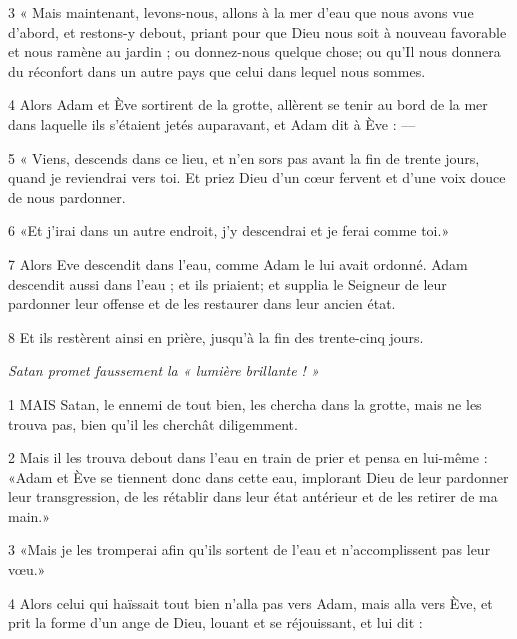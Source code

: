 \par 3 « Mais maintenant, levons-nous, allons à la mer d'eau que nous avons vue d'abord, et restons-y debout, priant pour que Dieu nous soit à nouveau favorable et nous ramène au jardin ; ou donnez-nous quelque chose; ou qu'Il nous donnera du réconfort dans un autre pays que celui dans lequel nous sommes.

\par 4 Alors Adam et Ève sortirent de la grotte, allèrent se tenir au bord de la mer dans laquelle ils s'étaient jetés auparavant, et Adam dit à Ève : —

\par 5 « Viens, descends dans ce lieu, et n'en sors pas avant la fin de trente jours, quand je reviendrai vers toi. Et priez Dieu d’un cœur fervent et d’une voix douce de nous pardonner.

\par 6 «Et j'irai dans un autre endroit, j'y descendrai et je ferai comme toi.»

\par 7 Alors Eve descendit dans l'eau, comme Adam le lui avait ordonné. Adam descendit aussi dans l'eau ; et ils priaient; et supplia le Seigneur de leur pardonner leur offense et de les restaurer dans leur ancien état.

\par 8 Et ils restèrent ainsi en prière, jusqu'à la fin des trente-cinq jours.


\par \textit{Satan promet faussement la « lumière brillante ! »}

\par 1 MAIS Satan, le ennemi de tout bien, les chercha dans la grotte, mais ne les trouva pas, bien qu'il les cherchât diligemment.

\par 2 Mais il les trouva debout dans l'eau en train de prier et pensa en lui-même : «Adam et Ève se tiennent donc dans cette eau, implorant Dieu de leur pardonner leur transgression, de les rétablir dans leur état antérieur et de les retirer de ma main.»

\par 3 «Mais je les tromperai afin qu'ils sortent de l'eau et n'accomplissent pas leur vœu.»

\par 4 Alors celui qui haïssait tout bien n'alla pas vers Adam, mais alla vers Ève, et prit la forme d'un ange de Dieu, louant et se réjouissant, et lui dit :

